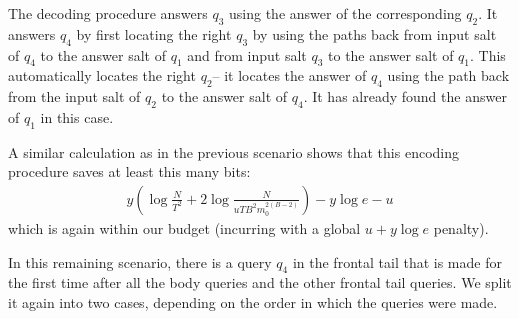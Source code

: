 {The decoding procedure answers $q_3$ using the answer of the corresponding $q_2$. It answers $q_4$ by first locating the right $q_3$ by using the paths back from input salt of $q_4$ to the answer salt of $q_1$ and from input salt $q_3$ to the answer salt of $q_1$. This automatically locates the right $q_2$-- it locates the answer of $q_4$ using the path back from the input salt of $q_2$ to the answer salt of $q_4$. It has already found the answer of $q_1$ in this case.


A similar calculation as in the previous scenario shows that this encoding procedure saves at least this many bits: 
\begin{align*}
y\left(\log \frac{N}{T^2} +2\log \frac{N}{uTB^2m_0^{2(B-2)}}\right)- y\log e -u
\end{align*}
which is again within our budget (incurring with a global $u+y\log e$ penalty).

In this remaining scenario, there is a query $q_4$ in the frontal tail that is made for the first time after all the body queries and the other frontal tail queries.  We split it again into two cases, depending on the order in which the queries were made.

}
